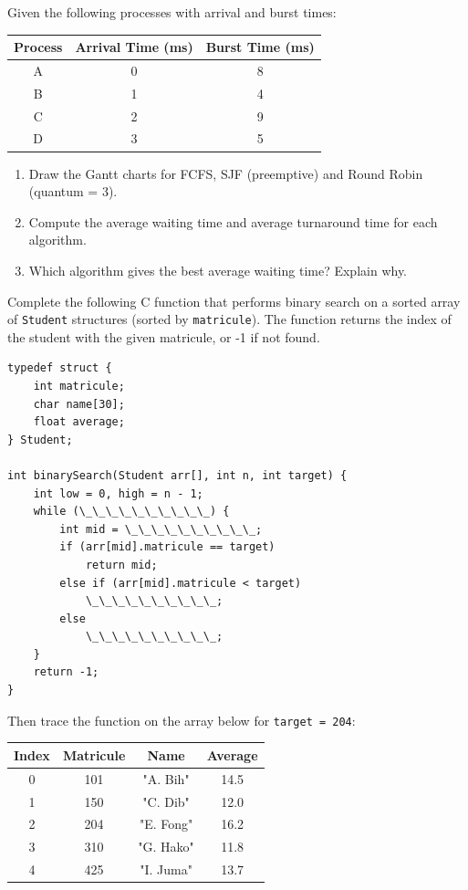 \documentclass[11pt]{article}
\newcounter{popsec}
\newcounter{popsub}
\newcommand{\courssub}[1]{%
  \stepcounter{popsub}%
  \par\vspace{9pt}\noindent{\popxbold\fontsize{11.5}{13}\selectfont\color{popink}{\color{poporange}\thepopsec.\thepopsub}\hspace{6pt}#1}\par\nopagebreak\vspace{4pt}
}
\begin{document}
\courssub{I practise}

\begin{exercice}
Given the following processes with arrival and burst times:

\begin{center}
\begin{tabular}{|c|c|c|}\hline
Process & Arrival Time (ms) & Burst Time (ms) \\ \hline
A & 0 & 8 \\
B & 1 & 4 \\
C & 2 & 9 \\
D & 3 & 5 \\ \hline
\end{tabular}
\end{center}

\begin{enumerate}
\item Draw the Gantt charts for FCFS, SJF (preemptive) and Round Robin (quantum = 3).
\item Compute the average waiting time and average turnaround time for each algorithm.
\item Which algorithm gives the best average waiting time? Explain why.
\end{enumerate}
\end{exercice}

\begin{exercice}
Complete the following C function that performs binary search on a sorted array of \texttt{Student} structures (sorted by \texttt{matricule}). The function returns the index of the student with the given matricule, or -1 if not found.

\begin{verbatim}
typedef struct {
    int matricule;
    char name[30];
    float average;
} Student;

int binarySearch(Student arr[], int n, int target) {
    int low = 0, high = n - 1;
    while (\_\_\_\_\_\_\_\_\_\_) {
        int mid = \_\_\_\_\_\_\_\_\_\_;
        if (arr[mid].matricule == target)
            return mid;
        else if (arr[mid].matricule < target)
            \_\_\_\_\_\_\_\_\_\_;
        else
            \_\_\_\_\_\_\_\_\_\_;
    }
    return -1;
}
\end{verbatim}

Then trace the function on the array below for \texttt{target = 204}:

\begin{center}
\begin{tabular}{|c|c|c|c|}\hline
Index & Matricule & Name & Average \\ \hline
0 & 101 & "A. Bih" & 14.5 \\
1 & 150 & "C. Dib" & 12.0 \\
2 & 204 & "E. Fong" & 16.2 \\
3 & 310 & "G. Hako" & 11.8 \\
4 & 425 & "I. Juma" & 13.7 \\ \hline
\end{tabular}
\end{center}
\end{exercice}
\end{document}
